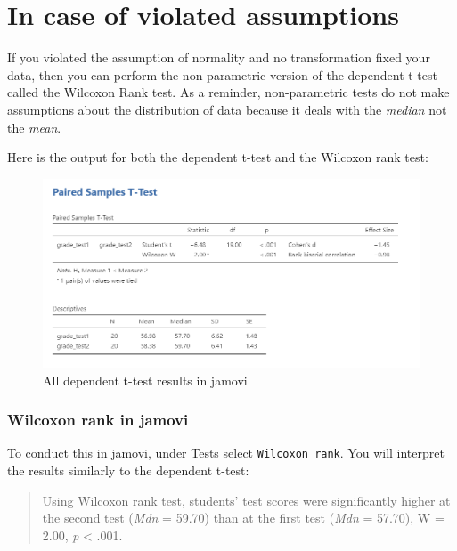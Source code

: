 \documentclass[
]{book}
\begin{document}
\hypertarget{in-case-of-violated-assumptions-1}{%
\section{In case of violated assumptions}\label{in-case-of-violated-assumptions-1}}

If you violated the assumption of normality and no transformation fixed your data, then you can perform the non-parametric version of the dependent t-test called the Wilcoxon Rank test. As a reminder, non-parametric tests do not make assumptions about the distribution of data because it deals with the \emph{median} not the \emph{mean}.

Here is the output for both the dependent t-test and the Wilcoxon rank test:

\begin{figure}

{\centering \includegraphics[width=1\linewidth]{images/03_dependent_t-test/dependent_results_full} 

}

\caption{All dependent t-test results in jamovi}\label{fig:unnamed-chunk-11}
\end{figure}

\hypertarget{wilcoxon-rank-in-jamovi}{%
\subsubsection{Wilcoxon rank in jamovi}\label{wilcoxon-rank-in-jamovi}}

To conduct this in jamovi, under Tests select \texttt{Wilcoxon\ rank}. You will interpret the results similarly to the dependent t-test:

\begin{quote}
Using Wilcoxon rank test, students' test scores were significantly higher at the second test (\emph{Mdn} = 59.70) than at the first test (\emph{Mdn} = 57.70), W = 2.00, \emph{p} \textless{} .001.
\end{quote}
\end{document}
